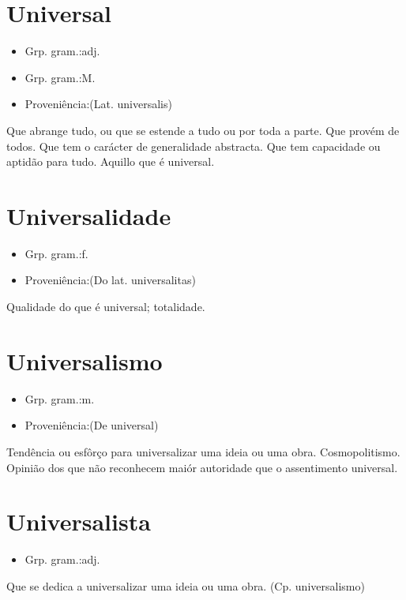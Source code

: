 \documentclass{article}
\begin{document}
\section{Universal}
\begin{itemize}
\item {Grp. gram.:adj.}
\end{itemize}
\begin{itemize}
\item {Grp. gram.:M.}
\end{itemize}
\begin{itemize}
\item {Proveniência:(Lat. \textunderscore universalis\textunderscore )}
\end{itemize}
Que abrange tudo, ou que se estende a tudo ou por toda a parte.
Que provém de todos.
Que tem o carácter de generalidade abstracta.
Que tem capacidade ou aptidão para tudo.
Aquillo que é universal.
\section{Universalidade}
\begin{itemize}
\item {Grp. gram.:f.}
\end{itemize}
\begin{itemize}
\item {Proveniência:(Do lat. \textunderscore universalitas\textunderscore )}
\end{itemize}
Qualidade do que é universal; totalidade.
\section{Universalismo}
\begin{itemize}
\item {Grp. gram.:m.}
\end{itemize}
\begin{itemize}
\item {Proveniência:(De \textunderscore universal\textunderscore )}
\end{itemize}
Tendência ou esfôrço para universalizar uma ideia ou uma obra.
Cosmopolitismo.
Opinião dos que não reconhecem maiór autoridade que o assentimento universal.
\section{Universalista}
\begin{itemize}
\item {Grp. gram.:adj.}
\end{itemize}
Que se dedica a universalizar uma ideia ou uma obra.
(Cp. \textunderscore universalismo\textunderscore )
\end{document}
